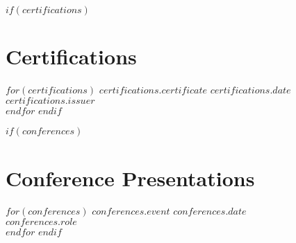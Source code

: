 \documentclass[11pt, a4paper]{article}
\begin{document}
$if(certifications)$
\section*{Certifications}
$for(certifications)$
\noindent\textbf{$certifications.certificate$} \hfill $certifications.date$\\
\emph{$certifications.issuer$}\\[0.3cm]
$endfor$
$endif$

$if(conferences)$
\section*{Conference Presentations}
$for(conferences)$
\noindent\textbf{$conferences.event$} \hfill $conferences.date$\\
\emph{$conferences.role$}\\[0.3cm]
$endfor$
$endif$
\end{document}
